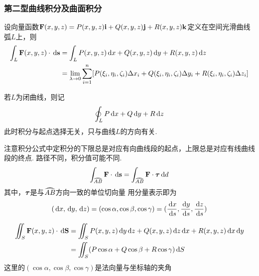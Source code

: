 \subsubsection{第二型曲线积分及曲面积分}
\begin{definition}[第二型曲线积分]
设向量函数$\mathbf{F}(x,y,z)=P(x,y,z)\mathbf{i}+Q(x,y,z)\mathbf{j}+R(x,y,z)\mathbf{k}$定义在空间光滑曲线弧$L$上，则
\[\begin{aligned}
\int_L\mathbf{F}(x,y,z)\cdot\,\mathrm{d}\mathbf{s}&=\int_LP(x,y,z)\,\mathrm{d} x+Q(x,y,z)\,\mathrm{d} y+R(x,y,z)\,\mathrm{d} z\\
&=\lim_{\lambda\to 0}\sum_{i=1}^n[P(\xi_i,\eta_i,\zeta_i)\Delta x_i+Q(\xi_i,\eta_i,\zeta_i)\Delta y_i+R(\xi_i,\eta_i,\zeta_i)\Delta z_i]
\end{aligned}\]
\end{definition}
若$L$为闭曲线，则记
\[\oint_LP\,\mathrm{d} x+Q\,\mathrm{d} y+R\,\mathrm{d} z\]
此时积分与起点选择无关，只与曲线$L$的方向有关.
\par 注意积分公式中定积分的下限总是对应有向曲线段的起点，上限总是对应有线曲线段的终点.
路径不同，积分值可能不同.
\[\int_{\wideparen{AB}}\vF\cdot \diff\vs=\int_{\arc{AB}}\vF\cdot\vtau\diff d\]
其中，$\bm{\tau}$是与$\arc{AB}$方向一致的单位切向量
用分量表示即为
\[(\,\mathrm{d} x,\,\mathrm{d} y,\,\mathrm{d} z)=(\cos\alpha,\cos\beta,\cos\gamma)=(\frac{\,\mathrm{d} x}{\,\mathrm{d} s},\frac{\,\mathrm{d} y}{\,\mathrm{d} s},\frac{\,\mathrm{d} z}{\,\mathrm{d} s})\]
\begin{definition}[第二型曲面积分]
\[\begin{aligned}
\iint_S\mathbf{F}(x,y,z)\cdot\,\mathrm{d}\mathbf{S}&=\iint_SP(x,y,z)\,\mathrm{d} y\,\mathrm{d} z+Q(x,y,z)\,\mathrm{d} z\,\mathrm{d} x+R(x,y,z)\,\mathrm{d} x\,\mathrm{d} y\\
&=\iint_S(P\cos\alpha+Q\cos\beta+R\cos\gamma)\,\mathrm{d} S
\end{aligned}\]
这里的$(\cos\alpha,\cos\beta,\cos\gamma)$是法向量与坐标轴的夹角
\end{definition}

